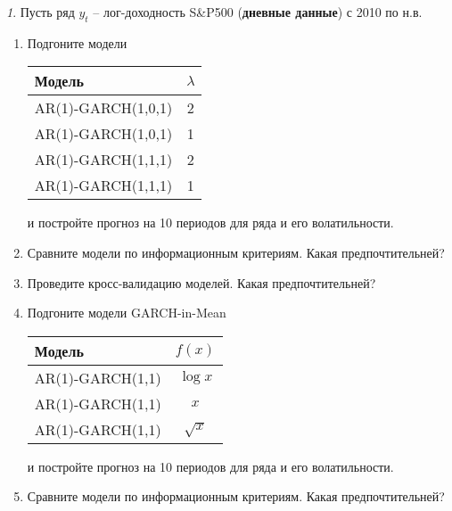 \documentclass[12pt]{article}
\theoremstyle{remark}
\newtheorem{exercise}{}[subsection]
\begin{document}
\begin{exercise}
Пусть ряд \(y_t\) -- лог-доходность S\&P500 (\textbf{дневные данные}) с 2010 по н.в.
\begin{enumerate}
	\item Подгоните модели
	\begin{center}
	\begin{tabular}{l|c}
		Модель & \(\lambda\) \\ \hline
		AR(1)-GARCH(1,0,1) & 2 \\
		AR(1)-GARCH(1,0,1) & 1 \\
		AR(1)-GARCH(1,1,1) & 2 \\
		AR(1)-GARCH(1,1,1) & 1 \\ \hline
	\end{tabular}
	\end{center} 
	и постройте прогноз на 10 периодов для ряда и его волатильности. 
	\item Сравните модели по информационным критериям. Какая предпочтительней?
	\item Проведите кросс-валидацию моделей. Какая предпочтительней?
	\item Подгоните модели GARCH-in-Mean
	\begin{center}
		\begin{tabular}{l|c}
			Модель & \(f(x)\) \\ \hline
			AR(1)-GARCH(1,1) & \(\log x\) \\
			AR(1)-GARCH(1,1) & \(x\) \\
			AR(1)-GARCH(1,1) & \(\sqrt{x}\) \\
		\end{tabular}
	\end{center} 
	и постройте прогноз на 10 периодов для ряда и его волатильности.
	\item Сравните модели по информационным критериям. Какая предпочтительней?
\end{enumerate}
\end{exercise}



\end{document}
